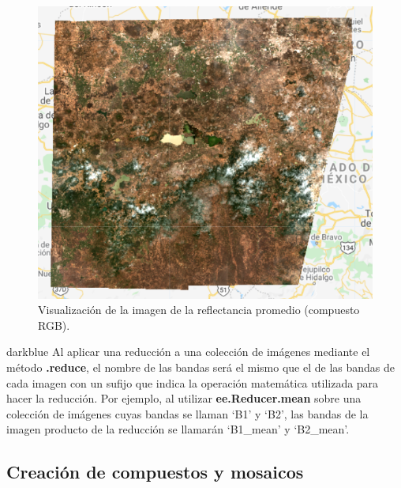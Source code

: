 \documentclass[
  12pt,
  letterpaper,
  twoside]{book}
\newcommand\boldpurple[1]{\textcolor{darkpurple}{\textbf{#1}}}
\begin{document}
\begin{figure}[H]

{\centering \includegraphics[width=0.8\linewidth]{Img/imredmean} 

}

\caption{Visualización de la imagen de la reflectancia promedio (compuesto RGB).}\label{fig:f1012}
\end{figure}

\begin{bluebox2}

\begin{awesomeblock}{5pt}{\faLightbulb}{darkblue}
Al aplicar una reducción a una colección de imágenes mediante el método \boldpurple{.reduce}, el nombre de las bandas será el mismo que el de las bandas de cada imagen con un sufijo que indica la operación matemática utilizada para hacer la reducción. Por ejemplo, al utilizar \boldpurple{ee.Reducer.mean} sobre una colección de imágenes cuyas bandas se llaman `B1' y `B2', las bandas de la imagen producto de la reducción se llamarán `B1\_mean' y `B2\_mean'.

\end{awesomeblock}

\end{bluebox2}

\hypertarget{creaciuxf3n-de-compuestos-y-mosaicos}{%
\subsection*{Creación de compuestos y mosaicos}\label{creaciuxf3n-de-compuestos-y-mosaicos}}
\end{document}
